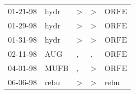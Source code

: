 \begin{supertabular}{lllll}
 01-21-98 &  hydr &  \textgreater &  \textgreater &  ORFE \\
 01-29-98 &  hydr &  \textgreater &  \textgreater &  ORFE \\
 01-31-98 &  hydr &  \textgreater &  \textgreater &  ORFE \\
 02-11-98 &   AUG &             , &             , &  ORFE \\
 04-01-98 &  MUFB &             , &  \textgreater &  ORFE \\
 06-06-98 &  rebu &  \textgreater &  \textgreater &  rebu \\
\end{supertabular}
